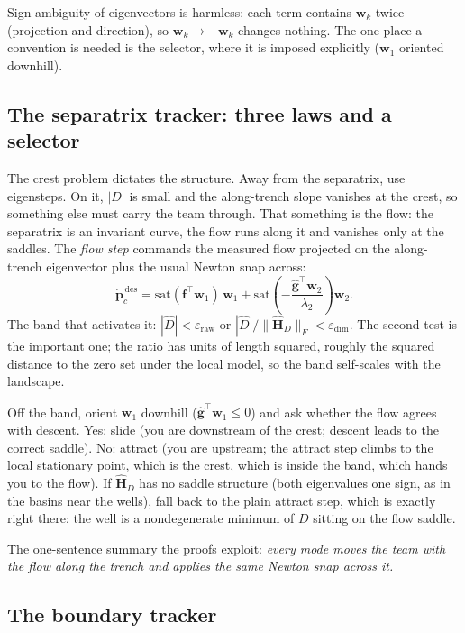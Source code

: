 \documentclass[11pt]{article}
\begin{document}
Sign ambiguity of eigenvectors is harmless: each term contains
$\mathbf{w}_k$ twice (projection and direction), so $\mathbf{w}_k \to
-\mathbf{w}_k$ changes nothing. The one place a convention is needed is the
selector, where it is imposed explicitly ($\mathbf{w}_1$ oriented downhill).

\subsection{The separatrix tracker: three laws and a selector}

The crest problem dictates the structure. Away from the separatrix, use
eigensteps. On it, $|D|$ is small and the along-trench slope vanishes at
the crest, so something else must carry the team through. That something is
the flow: the separatrix is an invariant curve, the flow runs along it and
vanishes only at the saddles. The \emph{flow step} commands the measured
flow projected on the along-trench eigenvector plus the usual Newton snap
across:
\begin{equation}
\dot{\mathbf{p}}_c^{\,\text{des}} =
\mathrm{sat}(\mathbf{f}^\top\mathbf{w}_1)\,\mathbf{w}_1
+ \mathrm{sat}\!\left(-\frac{\hat{\mathbf{g}}^\top\mathbf{w}_2}
{\lambda_2}\right)\mathbf{w}_2 .
\end{equation}
The band that activates it: $|\hat{D}| < \varepsilon_{\text{raw}}$ or
$|\hat{D}|/\|\hat{\mathbf{H}}_D\|_F < \varepsilon_{\text{dim}}$. The second
test is the important one; the ratio has units of length squared, roughly
the squared distance to the zero set under the local model, so the band
self-scales with the landscape.

Off the band, orient $\mathbf{w}_1$ downhill
($\hat{\mathbf{g}}^\top\mathbf{w}_1 \leq 0$) and ask whether the flow
agrees with descent. Yes: slide (you are downstream of the crest; descent
leads to the correct saddle). No: attract (you are upstream; the attract
step climbs to the local stationary point, which is the crest, which is
inside the band, which hands you to the flow). If $\hat{\mathbf{H}}_D$ has
no saddle structure (both eigenvalues one sign, as in the basins near the
wells), fall back to the plain attract step, which is exactly right there:
the well is a nondegenerate minimum of $D$ sitting on the flow saddle.

The one-sentence summary the proofs exploit: \emph{every mode moves the
team with the flow along the trench and applies the same Newton snap
across it.}

\subsection{The boundary tracker}
\end{document}
